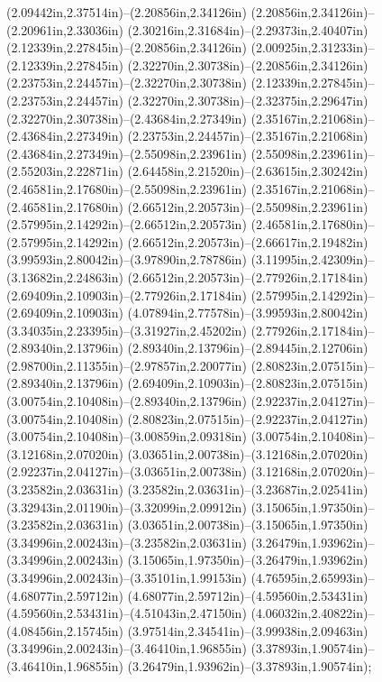 (2.09442in,2.37514in)--(2.20856in,2.34126in) (2.20856in,2.34126in)--(2.20961in,2.33036in) (2.30216in,2.31684in)--(2.29373in,2.40407in) (2.12339in,2.27845in)--(2.20856in,2.34126in) (2.00925in,2.31233in)--(2.12339in,2.27845in) (2.32270in,2.30738in)--(2.20856in,2.34126in) (2.23753in,2.24457in)--(2.32270in,2.30738in) (2.12339in,2.27845in)--(2.23753in,2.24457in) (2.32270in,2.30738in)--(2.32375in,2.29647in) (2.32270in,2.30738in)--(2.43684in,2.27349in) (2.35167in,2.21068in)--(2.43684in,2.27349in) (2.23753in,2.24457in)--(2.35167in,2.21068in) (2.43684in,2.27349in)--(2.55098in,2.23961in) (2.55098in,2.23961in)--(2.55203in,2.22871in) (2.64458in,2.21520in)--(2.63615in,2.30242in) (2.46581in,2.17680in)--(2.55098in,2.23961in) (2.35167in,2.21068in)--(2.46581in,2.17680in) (2.66512in,2.20573in)--(2.55098in,2.23961in) (2.57995in,2.14292in)--(2.66512in,2.20573in) (2.46581in,2.17680in)--(2.57995in,2.14292in) (2.66512in,2.20573in)--(2.66617in,2.19482in) (3.99593in,2.80042in)--(3.97890in,2.78786in) (3.11995in,2.42309in)--(3.13682in,2.24863in) (2.66512in,2.20573in)--(2.77926in,2.17184in) (2.69409in,2.10903in)--(2.77926in,2.17184in) (2.57995in,2.14292in)--(2.69409in,2.10903in) (4.07894in,2.77578in)--(3.99593in,2.80042in) (3.34035in,2.23395in)--(3.31927in,2.45202in) (2.77926in,2.17184in)--(2.89340in,2.13796in) (2.89340in,2.13796in)--(2.89445in,2.12706in) (2.98700in,2.11355in)--(2.97857in,2.20077in) (2.80823in,2.07515in)--(2.89340in,2.13796in) (2.69409in,2.10903in)--(2.80823in,2.07515in) (3.00754in,2.10408in)--(2.89340in,2.13796in) (2.92237in,2.04127in)--(3.00754in,2.10408in) (2.80823in,2.07515in)--(2.92237in,2.04127in) (3.00754in,2.10408in)--(3.00859in,2.09318in) (3.00754in,2.10408in)--(3.12168in,2.07020in) (3.03651in,2.00738in)--(3.12168in,2.07020in) (2.92237in,2.04127in)--(3.03651in,2.00738in) (3.12168in,2.07020in)--(3.23582in,2.03631in) (3.23582in,2.03631in)--(3.23687in,2.02541in) (3.32943in,2.01190in)--(3.32099in,2.09912in) (3.15065in,1.97350in)--(3.23582in,2.03631in) (3.03651in,2.00738in)--(3.15065in,1.97350in) (3.34996in,2.00243in)--(3.23582in,2.03631in) (3.26479in,1.93962in)--(3.34996in,2.00243in) (3.15065in,1.97350in)--(3.26479in,1.93962in) (3.34996in,2.00243in)--(3.35101in,1.99153in) (4.76595in,2.65993in)--(4.68077in,2.59712in) (4.68077in,2.59712in)--(4.59560in,2.53431in) (4.59560in,2.53431in)--(4.51043in,2.47150in) (4.06032in,2.40822in)--(4.08456in,2.15745in) (3.97514in,2.34541in)--(3.99938in,2.09463in) (3.34996in,2.00243in)--(3.46410in,1.96855in) (3.37893in,1.90574in)--(3.46410in,1.96855in) (3.26479in,1.93962in)--(3.37893in,1.90574in);
